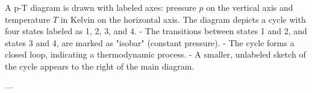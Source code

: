 A p-T diagram is drawn with labeled axes: pressure \( p \) on the vertical axis and temperature \( T \) in Kelvin on the horizontal axis. The diagram depicts a cycle with four states labeled as 1, 2, 3, and 4.  
- The transitions between states 1 and 2, and states 3 and 4, are marked as "isobar" (constant pressure).  
- The cycle forms a closed loop, indicating a thermodynamic process.  
- A smaller, unlabeled sketch of the cycle appears to the right of the main diagram.

---